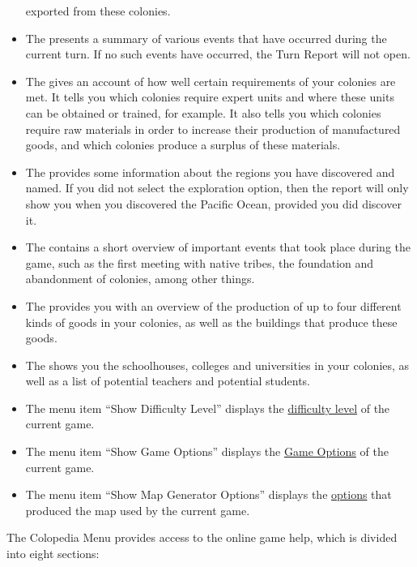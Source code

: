 \documentclass[12pt]{book}
\begin{document}
\begin{itemize}
exported from these colonies.
\item The  presents a summary of various events
  that have occurred during the current turn. If no such events have
  occurred, the Turn Report will not open.
\item The  gives an account of how well
certain requirements of your colonies are met. It tells you which
colonies require expert units and where these units can be obtained or
trained, for example. It also tells you which colonies require raw
materials in order to increase their production of manufactured goods,
and which colonies produce a surplus of these materials.
\item The  provides some information about
  the regions you have discovered and named. If you did not select the
  exploration option, then the report will only show you when you
  discovered the Pacific Ocean, provided you did discover it.
\item The  contains a short overview of
  important events that took place during the game, such as the first
  meeting with native tribes, the foundation and abandonment of
  colonies, among other things.
\item The  provides you with an overview of
  the production of up to four different kinds of goods in your
  colonies, as well as the buildings that produce these goods.
\item The  shows you the schoolhouses,
  colleges and universities in your colonies, as well as a list of
  potential teachers and potential students.
\item The menu item ``Show Difficulty Level'' displays the
  \hyperlink{difficulty level}{difficulty level} of the current game.
\item The menu item ``Show Game Options'' displays the \hyperlink{game
  options}{Game Options} of the current game.
\item The menu item ``Show Map Generator Options'' displays the
  \hyperlink{map generator options}{options} that produced the map
  used by the current game.

\end{itemize}

The \hypertarget{colopedia menu}{Colopedia Menu} provides access to
the online game help, which is divided into eight sections:
\end{document}
